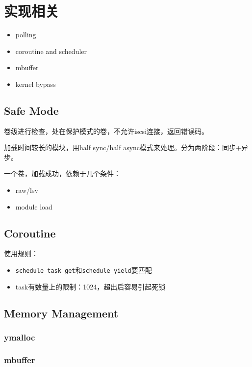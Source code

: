 \chapter{实现相关}

\begin{itemize}
    \item polling 
    \item coroutine and scheduler
    \item mbuffer
    \item kernel bypass
\end{itemize}

\section{Safe Mode}

卷级进行检查，处在保护模式的卷，不允许iscsi连接，返回错误码。

加载时间较长的模块，用half sync/half async模式来处理。分为两阶段：同步+异步。

一个卷，加载成功，依赖于几个条件：
\begin{itemize}
    \item raw/lsv
    \item module load
\end{itemize}

\section{Coroutine}

使用规则：
\begin{itemize}
    \item \verb|schedule_task_get|和\verb|schedule_yield|要匹配
    \item task有数量上的限制：1024，超出后容易引起死锁
\end{itemize}

\section{Memory Management}

\subsection{ymalloc}

\subsection{mbuffer}


